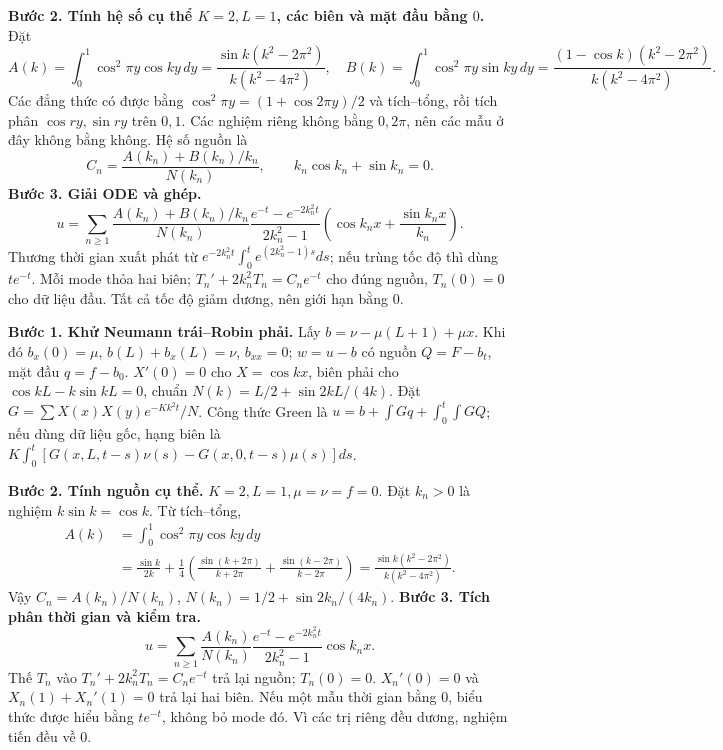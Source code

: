 \textbf{Bước 2. Tính hệ số cụ thể $K=2,L=1$, các biên và mặt đầu bằng $0$.}
Đặt
\[A(k)=\int_0^1\cos^2\pi y\cos ky\,dy
=\frac{\sin k(k^2-2\pi^2)}{k(k^2-4\pi^2)},\quad
B(k)=\int_0^1\cos^2\pi y\sin ky\,dy
=\frac{(1-\cos k)(k^2-2\pi^2)}{k(k^2-4\pi^2)}.\]
Các đẳng thức có được bằng $\cos^2\pi y=(1+\cos2\pi y)/2$ và tích–tổng, rồi tích phân $\cos ry,\sin ry$ trên $0,1$. Các nghiệm riêng không bằng $0,2\pi$, nên các mẫu ở đây không bằng không. Hệ số nguồn là
\[C_n=\frac{A(k_n)+B(k_n)/k_n}{N(k_n)},\qquad k_n\cos k_n+\sin k_n=0.\]
\textbf{Bước 3. Giải ODE và ghép.}
\[u=\sum_{n\ge1}\frac{A(k_n)+B(k_n)/k_n}{N(k_n)}
\frac{e^{-t}-e^{-2k_n^2t}}{2k_n^2-1}
\left(\cos k_nx+\frac{\sin k_nx}{k_n}\right).\]
Thương thời gian xuất phát từ $e^{-2k_n^2t}\int_0^te^{(2k_n^2-1)s}ds$; nếu trùng tốc độ thì dùng $te^{-t}$. Mỗi mode thỏa hai biên; $T_n'+2k_n^2T_n=C_ne^{-t}$ cho đúng nguồn, $T_n(0)=0$ cho dữ liệu đầu. Tất cả tốc độ giảm dương, nên giới hạn bằng $0$.

\textbf{Bước 1. Khử Neumann trái–Robin phải.}
Lấy $b=\nu-\mu(L+1)+\mu x$. Khi đó $b_x(0)=\mu$, $b(L)+b_x(L)=\nu$, $b_{xx}=0$; $w=u-b$ có nguồn $Q=F-b_t$, mặt đầu $q=f-b_0$. $X'(0)=0$ cho $X=\cos kx$, biên phải cho $\cos kL-k\sin kL=0$, chuẩn $N(k)=L/2+\sin2kL/(4k)$. Đặt $G=\sum X(x)X(y)e^{-Kk^2t}/N$. Công thức Green là $u=b+\int Gq+\int_0^t\int GQ$; nếu dùng dữ liệu gốc, hạng biên là $K\int_0^t[G(x,L,t-s)\nu(s)-G(x,0,t-s)\mu(s)]ds$.

\textbf{Bước 2. Tính nguồn cụ thể.}
$K=2,L=1,\mu=\nu=f=0$. Đặt $k_n>0$ là nghiệm $k\sin k=\cos k$. Từ tích–tổng,
\begin{align*}
A(k)&=\int_0^1\cos^2\pi y\cos ky\,dy\\
&=\frac{\sin k}{2k}+\frac14\left(\frac{\sin(k+2\pi)}{k+2\pi}+\frac{\sin(k-2\pi)}{k-2\pi}\right)
=\frac{\sin k(k^2-2\pi^2)}{k(k^2-4\pi^2)}.
\end{align*}
Vậy $C_n=A(k_n)/N(k_n)$, $N(k_n)=1/2+\sin2k_n/(4k_n)$.
\textbf{Bước 3. Tích phân thời gian và kiểm tra.}
\[u=\sum_{n\ge1}\frac{A(k_n)}{N(k_n)}
\frac{e^{-t}-e^{-2k_n^2t}}{2k_n^2-1}\cos k_nx.\]
Thế $T_n$ vào $T_n'+2k_n^2T_n=C_ne^{-t}$ trả lại nguồn; $T_n(0)=0$. $X_n'(0)=0$ và $X_n(1)+X_n'(1)=0$ trả lại hai biên. Nếu một mẫu thời gian bằng $0$, biểu thức được hiểu bằng $te^{-t}$, không bỏ mode đó. Vì các trị riêng đều dương, nghiệm tiến đều về $0$.

